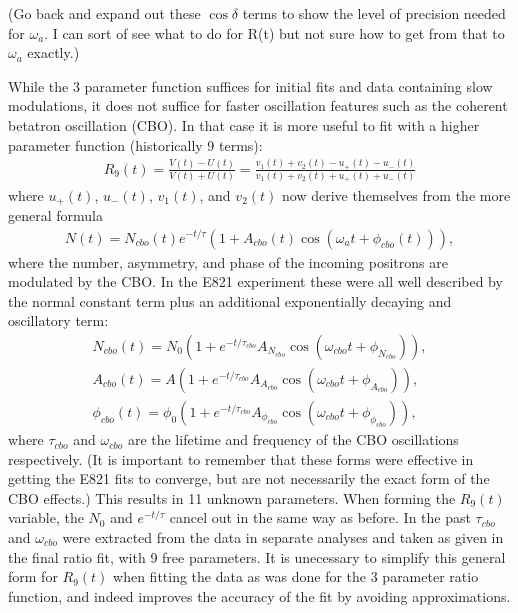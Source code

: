 (Go back and expand out these $\cos{\delta}$ terms to show the level of precision needed for $\omega_{a}$. I can sort of see what to do for R(t) but not sure how to get from that to $\omega_{a}$ exactly.)

While the 3 parameter function suffices for initial fits and data containing slow modulations, it does not suffice for faster oscillation features such as the coherent betatron oscillation (CBO). In that case it is more useful to fit with a higher parameter function (historically 9 terms):
	\begin{align}
		R_{9}(t) = \frac{V(t) - U(t)}{V(t) + U(t)} = \frac{v_{1}(t) + v_{2}(t) - u_{+}(t) - u_{-}(t)}{v_{1}(t) + v_{2}(t) + u_{+}(t) + u_{-}(t)}
	\end{align}
where $u_{+}(t)$, $u_{-}(t)$, $v_{1}(t)$, and $v_{2}(t)$ now derive themselves from the more general formula
	\begin{align}
		N(t) = N_{cbo}(t) e^{-t/\tau}(1 + A_{cbo}(t) \cos(\omega_{a}t + \phi_{cbo}(t))),
	\end{align}
where the number, asymmetry, and phase of the incoming positrons are modulated by the CBO. In the E821 experiment these were all well described by the normal constant term plus an additional exponentially decaying and oscillatory term:
	\begin{align}
		N_{cbo}(t) = N_{0}(1 + e^{-t/\tau_{cbo}} A_{N_{cbo}} \cos(\omega_{cbo}t + \phi_{N_{cbo}})), \\
		A_{cbo}(t) = A(1 + e^{-t/\tau_{cbo}} A_{A_{cbo}} \cos(\omega_{cbo}t + \phi_{A_{cbo}})), \\
		\phi_{cbo}(t) = \phi_{0}(1 + e^{-t/\tau_{cbo}} A_{\phi_{cbo}} \cos(\omega_{cbo}t + \phi_{\phi_{cbo}})),
	\end{align}
where $\tau_{cbo}$ and $\omega_{cbo}$ are the lifetime and frequency of the CBO oscillations respectively. (It is important to remember that these forms were effective in getting the E821 fits to converge, but are not necessarily the exact form of the CBO effects.) This results in 11 unknown parameters. When forming the $R_{9}(t)$ variable, the $N_{0}$ and $e^{-t/\tau}$ cancel out in the same way as before. In the past $\tau_{cbo}$ and $\omega_{cbo}$ were extracted from the data in separate analyses and taken as given in the final ratio fit, with 9 free parameters. It is unecessary to simplify this general form for $R_{9}(t)$ when fitting the data as was done for the 3 parameter ratio function, and indeed improves the accuracy of the fit by avoiding approximations. 

